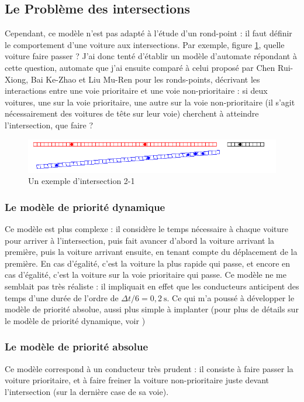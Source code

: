 \documentclass[11pt]{article}
\begin{document}
	\subsection{Le Problème des intersections}
	Cependant, ce modèle n'est pas adapté à l'étude d'un rond-point : il faut définir le comportement d'une voiture aux intersections. Par exemple, figure \ref{locdeb}, quelle voiture faire passer ? J'ai donc tenté d'établir un modèle d'automate répondant à cette question, automate que j'ai ensuite comparé à celui proposé par Chen Rui-Xiong, Bai Ke-Zhao et Liu Mu-Ren\cite{ChPh} pour les ronds-points, décrivant les interactions entre une voie prioritaire et une voie non-prioritaire : si deux voitures, une sur la voie prioritaire, une autre sur la voie non-prioritaire (il s'agit nécessairement des voitures de tête sur leur voie) cherchent à atteindre l'intersection, que faire ?
	\begin{figure}
		\begin{center}
			\includegraphics[scale=0.5]{./images/localdebut}
		\end{center}
		\caption{\label{locdeb}Un exemple d'intersection 2-1}
	\end{figure}
		\subsubsection{Le modèle de priorité dynamique}
		Ce modèle est plus complexe : il considère le temps nécessaire à chaque voiture pour arriver à l'intersection, puis fait avancer d'abord la voiture arrivant la première, puis la voiture arrivant ensuite, en tenant compte du déplacement de la première. En cas d'égalité, c'est la voiture la plus rapide qui passe, et encore en cas d'égalité, c'est la voiture sur la voie prioritaire qui passe. Ce modèle ne me semblait pas très réaliste : il impliquait en effet que les conducteurs anticipent des temps d'une durée de l'ordre de $\Delta	t / 6 = 0,2 ~\mathrm{s}$. Ce qui m'a poussé à développer le modèle de priorité absolue, aussi plus simple à implanter (pour plus de détails sur le modèle de priorité dynamique, voir \cite{ChPh})
		\subsubsection{Le modèle de priorité absolue}
		Ce modèle correspond à un conducteur très prudent : il consiste à faire passer la voiture prioritaire, et à faire freiner la voiture non-prioritaire juste devant l'intersection (sur la dernière case de sa voie).
		
\end{document}
